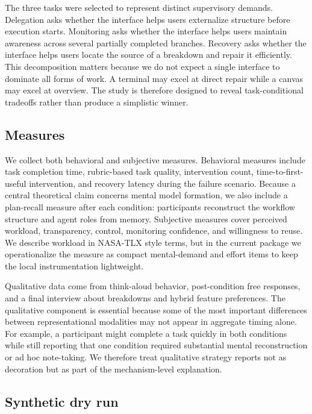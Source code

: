\documentclass[sigconf]{acmart}
\begin{document}
The three tasks were selected to represent distinct supervisory demands. Delegation asks whether the interface helps users externalize structure before execution starts. Monitoring asks whether the interface helps users maintain awareness across several partially completed branches. Recovery asks whether the interface helps users locate the source of a breakdown and repair it efficiently. This decomposition matters because we do not expect a single interface to dominate all forms of work. A terminal may excel at direct repair while a canvas may excel at overview. The study is therefore designed to reveal task-conditional tradeoffs rather than produce a simplistic winner.

\subsection{Measures}

We collect both behavioral and subjective measures. Behavioral measures include task completion time, rubric-based task quality, intervention count, time-to-first-useful intervention, and recovery latency during the failure scenario. Because a central theoretical claim concerns mental model formation, we also include a plan-recall measure after each condition: participants reconstruct the workflow structure and agent roles from memory. Subjective measures cover perceived workload, transparency, control, monitoring confidence, and willingness to reuse. We describe workload in NASA-TLX style terms, but in the current package we operationalize the measure as compact mental-demand and effort items to keep the local instrumentation lightweight.

Qualitative data come from think-aloud behavior, post-condition free responses, and a final interview about breakdowns and hybrid feature preferences. The qualitative component is essential because some of the most important differences between representational modalities may not appear in aggregate timing alone. For example, a participant might complete a task quickly in both conditions while still reporting that one condition required substantial mental reconstruction or ad hoc note-taking. We therefore treat qualitative strategy reports not as decoration but as part of the mechanism-level explanation.

\subsection{Synthetic dry run}
\end{document}
